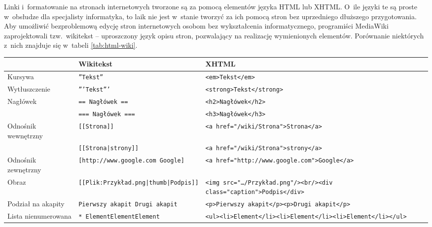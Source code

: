 \documentclass{pracamgr}
\begin{document}
Linki i~formatowanie na stronach internetowych tworzone są za pomocą elementów języka HTML lub XHTML. O~ile języki te są proste w~obsłudze dla specjalisty informatyka, to laik nie jest w~stanie tworzyć za ich pomocą stron bez uprzedniego dłuższego przygotowania. Aby umożliwić bezproblemową edycję stron internetowych osobom bez wykształcenia informatycznego, programiści MediaWiki zaprojektowali tzw.\ wikitekst -- uproszczony język opisu stron, pozwalający na realizację wymienionych elementów. Porównanie niektórych z~nich znajduje się w~tabeli \ref{tab:html-wiki}.

\begin{table}[h]
\begin{center}
\footnotesize{
	\begin{tabularx}{\textwidth}{ |l|X|X| }
		\hline & Wikitekst & XHTML \\
		\hline
		\hline Kursywa & \texttt{''Tekst''} & \texttt{<em>Tekst</em>} \\
		\hline Wytłuszczenie & \texttt{'''Tekst'''} & \texttt{<strong>Tekst</strong>} \\
		\hline Nagłówek & \texttt{== Nagłówek ==} & \texttt{<h2>Nagłówek</h2>} \\
		 & \texttt{=== Nagłówek ===} & \texttt{<h3>Nagłówek</h3>} \\
		\hline Odnośnik wewnętrzny & \texttt{[[Strona]]} & \texttt{<a href="/wiki/Strona">Strona</a>} \\
		 & \texttt{[[Strona|strony]]} & \texttt{<a href="/wiki/Strona">strony</a>} \\
		\hline Odnośnik zewnętrzny & \texttt{[http://www.google.com Google]}
		 & \texttt{<a href="http://www.google.com">\newline Google</a>} \\
		\hline Obraz & \texttt{[[Plik:Przykład.png|thumb|Podpis]]} & \texttt{<img src="\dots /Przykład.png"/><br/>\newline <div class="caption">Podpis</div>} \\
		\hline Podział na akapity & \texttt{Pierwszy akapit \newline \newline Drugi akapit}
		 & \texttt{<p>Pierwszy akapit</p>\newline <p>Drugi akapit</p>} \\
		\hline Lista nienumerowana & \texttt{* Element\newline * Element\newline * Element}
		 & \texttt{<ul>\newline <li>Element</li>\newline <li>Element</li>\newline <li>Element</li>\newline </ul>}\\

\end{tabularx}}
\end{center}
\end{table}
\end{document}
